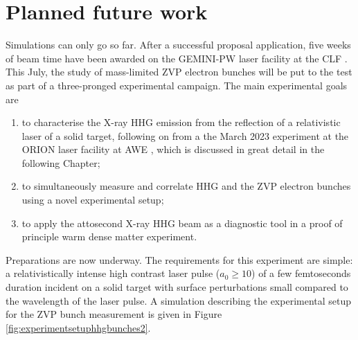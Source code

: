 

\section{Planned future work}\label{sec:zvp-future_work}
Simulations can only go so far. After a successful proposal application, five weeks of beam time have been awarded on the GEMINI-PW laser facility at the \ac{CLF} \cite{LaserSystemGemini}. This July, the study of mass-limited ZVP electron bunches will be put to the test as part of a three-pronged experimental campaign. The main experimental goals are
\begin{enumerate}
	\item to characterise the X-ray \ac{HHG} emission from the reflection of a relativistic laser of a solid target, following on from a the March 2023 experiment at the ORION laser facility at AWE \cite{hoppsOverviewLaserSystems2013}, which is discussed in great detail in the following Chapter;
	\item to simultaneously measure and correlate \ac{HHG} and the ZVP electron bunches using a novel experimental setup;
	\item to apply the attosecond X-ray \ac{HHG} beam as a diagnostic tool in a proof of principle warm dense matter experiment.
\end{enumerate}
Preparations are now underway. The requirements for this experiment are simple: a relativistically intense high contrast laser pulse ($a_0 \ge 10$) of a few femtoseconds duration incident on a solid target with surface perturbations small compared to the wavelength of the laser pulse. A simulation describing the experimental setup for the ZVP bunch measurement is given in Figure \ref{fig:experimentsetuphhgbunches2}. 
